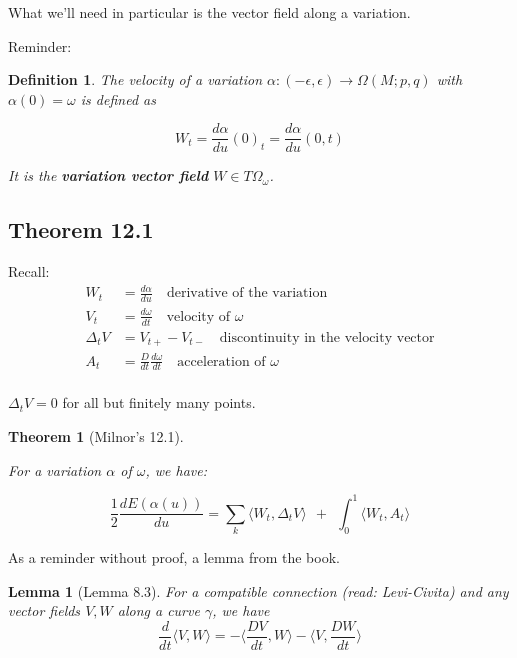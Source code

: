 \documentclass{article}
\newtheorem{thm}{Theorem}
\newtheorem{def}{Definition}
\newtheorem*{lemm*}{Lemma}
\newcommand{\angle}[1]{\langle #1 \rangle}
\begin{document}
What we'll need in particular is the vector field along a variation.

Reminder:

\begin{def}
\label{def:vel_of_var}
    The velocity of a variation $\alpha: (-\epsilon, \epsilon) \rightarrow \Omega(M;p,q)$ with
    $\alpha(0) = \omega$ is defined as

    \[ W_t = \frac{d\alpha}{du}(0)_t = \frac{d\alpha}{du}(0, t) \]

    It is the \textbf{variation vector field} $W \in T\Omega_{\omega}$.
\end{def}
\subsection{Theorem 12.1}


Recall:
\[
    \begin{align*}
        W_t &= \frac{d\alpha}{du} \quad\text{derivative of the variation} \\
        V_t &= \frac{d\omega}{dt} \quad\text{velocity of $\omega$} \\
        \Delta_tV &= V_{t+} - V_{t-} \quad\text{discontinuity in the velocity vector} \\
        A_t &= \frac{D}{dt} \frac{d\omega}{dt} \quad\text{acceleration of $\omega$} \\
    \end{align*}
\]

$\Delta_tV = 0$ for all but finitely many points.


\begin{thm}[Milnor's 12.1]
    \label{thm:12.1}

    For a variation $\alpha$ of $\omega$, we have:

    \[
        \frac{1}{2} \frac{dE(\alpha(u))}{du} =
        \sum_{k} \angle{ W_t, \Delta_tV } \ \ + \ \ \int_0^1 \angle{ W_t, A_t }
    \]

\end{thm}

As a reminder without proof, a lemma from the book.

\begin{lemm*}[Lemma 8.3]
    For a compatible connection (read: Levi-Civita) and any vector fields $V,W$ along a curve
    $\gamma$, we have
    \[
        \frac{d}{dt}\langle V, W \rangle   =
        - \langle \frac{DV}{dt}, W \rangle - \langle V, \frac{DW}{dt} \rangle
    \]
\end{lemm*}
\end{document}
